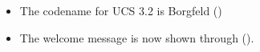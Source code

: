 \newcommand{\ucsUCRV}[1]{Univention Configuration Registry variable \ucsCommand{\ucsBCindex{#1}}}
\newcommand{\ucsCVE}[1]{\href{http://security-tracker.debian.org/tracker/CVE-#1}{CVE-#1}}

\begin{itemize}
\item The codename for UCS 3.2 is Borgfeld ()

\item The welcome message is now shown through  ().

\end{itemize}


